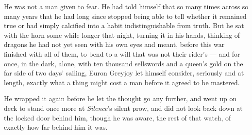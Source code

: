 He was not a man given to fear. He had told himself that so many times across so many years that he had long since stopped being able to tell whether it remained true or had simply calcified into a habit indistinguishable from truth. But he sat with the horn some while longer that night, turning it in his hands, thinking of dragons he had not yet seen with his own eyes and meant, before this war finished with all of them, to bend to a will that was not their rider’s — and for once, in the dark, alone, with ten thousand sellswords and a queen’s gold on the far side of two days’ sailing, Euron Greyjoy let himself consider, seriously and at length, exactly what a thing might cost a man before it agreed to be mastered.

He wrapped it again before he let the thought go any further, and went up on deck to stand once more at \textit{Silence}’s silent prow, and did not look back down at the locked door behind him, though he was aware, the rest of that watch, of exactly how far behind him it was.